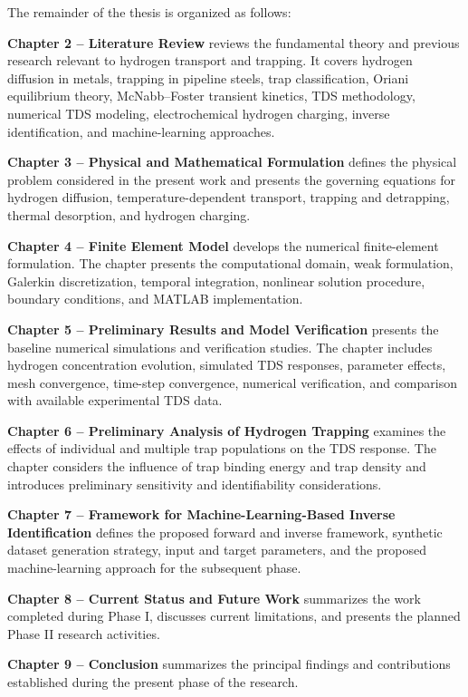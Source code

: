 \documentclass[a4paper,12pt,oneside]{report}
\begin{document}
The remainder of the thesis is organized as follows:

\textbf{Chapter 2 -- Literature Review} reviews the fundamental theory and previous research relevant to hydrogen transport and trapping. It covers hydrogen diffusion in metals, trapping in pipeline steels, trap classification, Oriani equilibrium theory, McNabb--Foster transient kinetics, TDS methodology, numerical TDS modeling, electrochemical hydrogen charging, inverse identification, and machine-learning approaches.

\textbf{Chapter 3 -- Physical and Mathematical Formulation} defines the physical problem considered in the present work and presents the governing equations for hydrogen diffusion, temperature-dependent transport, trapping and detrapping, thermal desorption, and hydrogen charging.

\textbf{Chapter 4 -- Finite Element Model} develops the numerical finite-element formulation. The chapter presents the computational domain, weak formulation, Galerkin discretization, temporal integration, nonlinear solution procedure, boundary conditions, and MATLAB implementation.

\textbf{Chapter 5 -- Preliminary Results and Model Verification} presents the baseline numerical simulations and verification studies. The chapter includes hydrogen concentration evolution, simulated TDS responses, parameter effects, mesh convergence, time-step convergence, numerical verification, and comparison with available experimental TDS data.

\textbf{Chapter 6 -- Preliminary Analysis of Hydrogen Trapping} examines the effects of individual and multiple trap populations on the TDS response. The chapter considers the influence of trap binding energy and trap density and introduces preliminary sensitivity and identifiability considerations.

\textbf{Chapter 7 -- Framework for Machine-Learning-Based Inverse Identification} defines the proposed forward and inverse framework, synthetic dataset generation strategy, input and target parameters, and the proposed machine-learning approach for the subsequent phase.

\textbf{Chapter 8 -- Current Status and Future Work} summarizes the work completed during Phase I, discusses current limitations, and presents the planned Phase II research activities.

\textbf{Chapter 9 -- Conclusion} summarizes the principal findings and contributions established during the present phase of the research.
\end{document}
